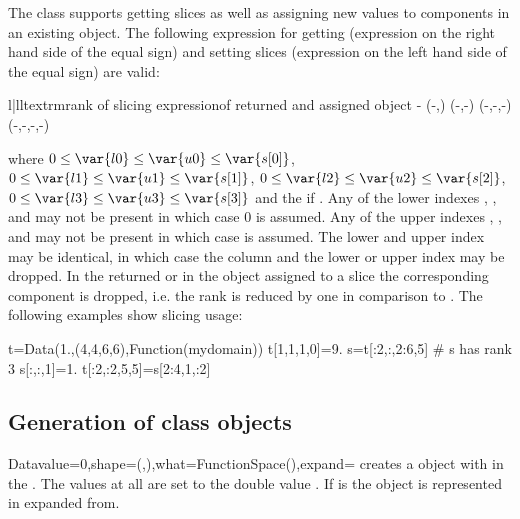 The \Data class supports getting slices as well as assigning new values to components in an existing
\Data object. 
The following expression for getting (expression on the right hand side of the
equal sign) and setting slices (expression on the left hand side of the
equal sign) are valid:
\begin{tableiii}{l|ll}{textrm}{rank of }{slicing expression}{\Shape of returned and assigned object}
                      {-}
                   {(-,)}
             {(-,-)}
      {(-,-,-)}
 {(-,-,-,-)}
\end{tableiii}
where 
$0 \le \var{l0} \le \var{u0} \le \var{s[0]}$,
$0 \le \var{l1} \le \var{u1} \le \var{s[1]}$, 
$0 \le \var{l2} \le \var{u2} \le \var{s[2]}$, 
$0 \le \var{l3} \le \var{u3} \le \var{s[3]}$ and  the \Shape if . 
Any of the lower indexes , ,  and  may not be present in which case 
$0$ is assumed. 
Any of the upper indexes , ,  and  may not be present in which case 
 is assumed. The lower and upper index may be identical, in which case the column and the lower or upper
index may be dropped. In the returned or in the object assigned to a slice the corresponding component is dropped,
i.e. the rank is reduced by one in comparison to .
The following examples show slicing usage:  
\begin{python}
t=Data(1.,(4,4,6,6),Function(mydomain))
t[1,1,1,0]=9.
s=t[:2,:,2:6,5] # s has rank 3
s[:,:,1]=1.
t[:2,:2,5,5]=s[2:4,1,:2]
\end{python}

\subsection{Generation of \Data class objects}
\begin{classdesc}{Data}{value=0,shape=(,),what=FunctionSpace(),expand=\False}
creates a \Data object with \Shape {} in the \FunctionSpace {}.
The values at all \DataSamplePoints are set to the double value . If  is \True
the \Data object is represented in expanded from.
\end{classdesc}

